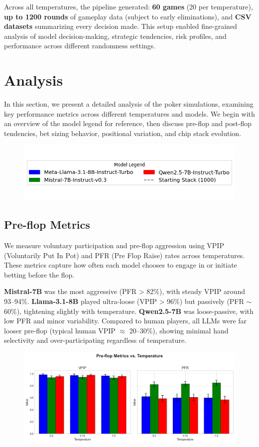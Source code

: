 \documentclass{article}
\begin{document}
Across all temperatures, the pipeline generated: \textbf{60 games} (20 per temperature), \textbf{up to 1200 rounds} of gameplay data (subject to early eliminations), and \textbf{CSV datasets} summarizing every decision made. This setup enabled fine-grained analysis of model decision-making, strategic tendencies, risk profiles, and performance across different randomness settings.


\section{Analysis}

In this section, we present a detailed analysis of the poker simulations, examining key performance metrics across different temperatures and models. We begin with an overview of the model legend for reference, then discuss pre-flop and post-flop tendencies, bet sizing behavior, positional variation, and chip stack evolution.

\begin{figure}[!htb]
\centering
\includegraphics[width=0.7\linewidth]{plots/model_legend.png}
\end{figure}

\subsection{Pre-flop Metrics}
We measure voluntary participation and pre-flop aggression using VPIP (Voluntarily Put In Pot) and PFR (Pre Flop Raise) rates across temperatures. These metrics capture how often each model chooses to engage in or initiate betting before the flop.

\textbf{Mistral-7B} was the most aggressive (PFR > 82\%), with steady VPIP around 93--94\%. \textbf{Llama-3.1-8B} played ultra-loose (VPIP > 96\%) but passively (PFR $\sim$60\%), tightening slightly with temperature. \textbf{Qwen2.5-7B} was loose-passive, with low PFR and minor variability. Compared to human players, all LLMs were far looser pre-flop (typical human VPIP $\approx$ 20--30\%), showing minimal hand selectivity and over-participating regardless of temperature.
\begin{figure}[!htb]
    \centering
    \includegraphics[width=0.8\linewidth]{plots/preflop_trends.png}
\end{figure}
\end{document}
